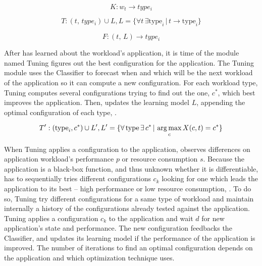 \begin{equation}
  K: w_t \rightarrow type_i
  \label{eq:classify}
\end{equation}

\begin{equation}
  T: (t,\, type_i) \cup L, L = \{ \forall t\,\exists \text{type}_i\, |\, t \rightarrow \text{type}_i \}
  \label{eq:training}
\end{equation}

\begin{equation}
  F: (t, \, L) \rightarrow type_i
  \label{eq:forecast}
\end{equation}

After \name has learned about the workload's application,  it is time of the module named
Tuning figures out the best configuration for the application. The Tuning module
uses the Classifier to forecast when and which will be the next workload of the
application so it can compute a new configuration. For each workload type,
Tuning computes several configurations trying to find out the one, $c^{*}$,
which best improves the application. Then, \name updates the learning model $L$,
appending the optimal configuration of each type, .

\begin{equation}
  T': (\text{type}_i, c^{*} )\cup L', L' = \{ \forall\, \text{type}\, \exists\, c^{*}\, |\, \operatorname*{arg\,max}_c X(c,t) = c^{*}\}
  \label{eq:training-updated}
\end{equation}

When Tuning applies a configuration to the application, \name observes
differences on application workload's performance $p$ or resource consumption
$s$. Because the application is a black-box function, and thus unknown whether
it is differentiable, \name has to sequentially tries different configurations
$c_k$ looking for one which leads the application to its best -- high
performance or low resource consumption, . To do so,
Tuning try different configurations for a same type of workload and maintain
internally a history of the configurations already tested against the
application.  Tuning applies a configuration $c_k$ to the application and wait
$d$ for new application's state and performance. The new configuration feedbacks
the Classifier, and updates its learning model if the performance of the
application is improved. The number of iterations to find an optimal
configuration depends on the application and which optimization technique \name
uses.

